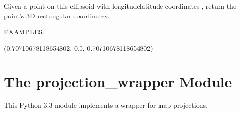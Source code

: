 \documentclass[a4paper,12ptopenany,oneside,english]{sphinxmanual}
\begin{document}
\begin{fulllineitems}

\begin{fulllineitems}
\label{\detokenize{ellipsoids:rhealpixdggs.ellipsoids.Ellipsoid.xyz}}
\pysigstartsignatures
{}
\pysigstopsignatures
\sphinxAtStartPar
Given a point on this ellipsoid with longitude\sphinxhyphen{}latitude coordinates
, return the point’s 3D rectangular coordinates.

\sphinxAtStartPar
EXAMPLES:

\begin{sphinxVerbatim}[commandchars=\\\{\}]
  
  
\end{sphinxVerbatim}
\begin{description}
\sphinxAtStartPar
(0.70710678118654802, 0.0, 0.70710678118654802)

\end{description}

\end{fulllineitems}


\end{fulllineitems}


\sphinxstepscope


\chapter{The projection\_wrapper Module}
\label{\detokenize{projection_wrapper:module-rhealpixdggs.projection_wrapper}}\label{\detokenize{projection_wrapper:the-projection-wrapper-module}}\label{\detokenize{projection_wrapper::doc}}
\sphinxAtStartPar
This Python 3.3 module implements a wrapper for map projections.
\end{document}
